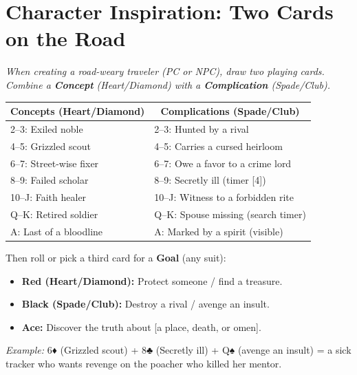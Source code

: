\section*{Character Inspiration: Two Cards on the Road}
\noindent \textit{When creating a road-weary traveler (PC or NPC), draw two playing cards. Combine a \textbf{Concept} (Heart/Diamond) with a \textbf{Complication} (Spade/Club).}

\begin{tabular}{@{}p{}p{}}
\toprule
\multicolumn{1}{c}{\textbf{Concepts (Heart/Diamond)}} & \multicolumn{1}{c}{\textbf{Complications (Spade/Club)}} \\
\midrule
2--3: Exiled noble & 2--3: Hunted by a rival \\
4--5: Grizzled scout & 4--5: Carries a cursed heirloom \\
6--7: Street-wise fixer & 6--7: Owe a favor to a crime lord \\
8--9: Failed scholar & 8--9: Secretly ill (timer [4]) \\
10--J: Faith healer & 10--J: Witness to a forbidden rite \\
Q--K: Retired soldier & Q--K: Spouse missing (search timer) \\
A: Last of a bloodline & A: Marked by a spirit (visible) \\
\bottomrule
\end{tabular}

\noindent Then roll or pick a third card for a \textbf{Goal} (any suit):
\begin{itemize}
  \item \textbf{Red (Heart/Diamond):} Protect someone / find a treasure.
  \item \textbf{Black (Spade/Club):} Destroy a rival / avenge an insult.
  \item \textbf{Ace:} Discover the truth about [a place, death, or omen].
\end{itemize}

\noindent \textit{Example:} 6♦ (Grizzled scout) + 8♣ (Secretly ill) + Q♠ (avenge an insult) = a sick tracker who wants revenge on the poacher who killed her mentor.



